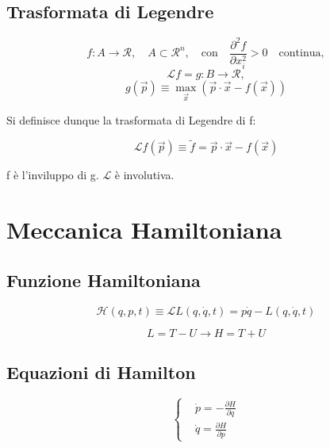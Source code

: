 \documentclass{article}
\begin{document}
            \subsection{Trasformata di Legendre}

            \[
                f: A \rightarrow \mathcal{R}, \quad A \subset \mathcal{R}^n, \quad \text{con} \quad \frac{\partial ^2 f}{\partial x_i^2}>0 \quad \text{continua},
            \]
            \[
                \mathcal{L}f = g: B \rightarrow \mathcal{R},
            \]
            \[
                g(\vec{p}) \equiv \max_{\vec{x}} (\vec{p} \cdot \vec{x} - f(\vec{x}))
            \]

            Si definisce dunque la trasformata di Legendre di f:

            \[
                \mathcal{L}f(\vec{p})\equiv \tilde{f}= \vec{p} \cdot \vec{x} - f(\vec{x})
            \]

            f è l'inviluppo di g.
        $\mathcal{L}$ è involutiva.


            \section{Meccanica Hamiltoniana}

            \subsection{Funzione Hamiltoniana}

            \begin{equation}
                \mathcal{H}(q,p, t)\equiv \mathcal{L}L(q,\dot q, t)= p\dot q- L(q,\dot q, t)
            \end{equation}

            \begin{equation}
                L=T-U \rightarrow H= T+U
            \end{equation}

            \subsection{Equazioni di Hamilton}
            \begin{equation}
                \left\{
                \begin{aligned}
                     & \dot p=-\frac{\partial H}{\partial q} \\
                     & \dot q= \frac{\partial H}{\partial p}
                \end{aligned}
                \right.
            \end{equation}
\end{document}
